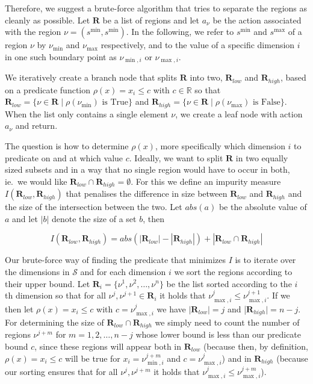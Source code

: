 Therefore, we suggest a brute-force algorithm that tries to separate the regions
as cleanly as possible. Let $\mathbf{R}$ be a list of regions and let $a_{\nu}$
be the action associated with the region $\nu = (s^{\min}, s^{\min})$. In the
following, we refer to $s^{\min}$ and $s^{\max}$ of a region $\nu$ by
$\nu_{\min}$ and $\nu_{\max}$ respectively, and to the value of a specific
dimension $i$ in one such boundary point as $\nu_{\min, i}$ or $\nu_{\max,i}$.

We iteratively create a branch node that splits $\mathbf{R}$ into two,
$\mathbf{R}_{low}$ and $\mathbf{R}_{high}$, based on a predicate function
$\rho(x) = x_i \le c$ with $c \in \mathbb{R}$ so that $\mathbf{R}_{low} = \{ \nu
\in \mathbf{R} \mid \rho(\nu_{\min}) \text{~is True} \}$ and $\mathbf{R}_{high}
= \{ \nu \in \mathbf{R} \mid \rho(\nu_{\max}) \text{~is False} \}$. When the
list only contains a single element $\nu$, we create a leaf node with action
$a_{\nu}$ and return.

The question is how to determine $\rho(x)$, more specifically which dimension
$i$ to predicate on and at which value $c$. Ideally, we want to split
$\mathbf{R}$ in two equally sized subsets and in a way that no single region
would have to occur in both, ie.\ we would like $\mathbf{R}_{low} \cap
\mathbf{R}_{high} = \emptyset$. For this we define an impurity measure
$I(\mathbf{R}_{low},\mathbf{R}_{high})$ that penalises the difference in size
between $\mathbf{R}_{low}$ and $\mathbf{R}_{high}$ and the size of the
intersection between the two. Let $abs(a)$ be the absolute value of $a$ and let
$|b|$ denote the size of a set $b$, then

\[
    I(\mathbf{R}_{low}, \mathbf{R}_{high})  = abs(|\mathbf{R}_{low}| -
    |\mathbf{R}_{high}|) + |\mathbf{R}_{low} \cap \mathbf{R}_{high}|
\]


Our brute-force way of finding the predicate that minimizes $I$ is to iterate
over the dimensions in $\mathcal{S}$ and for each dimension $i$ we sort the
regions according to their upper bound. Let $\mathbf{R}_i = \{ \nu^1, \nu^2,
\ldots, \nu^n \}$ be the list sorted according to the $i$ th dimension so that
for all $\nu^j, \nu^{j+1} \in \mathbf{R}_{i}$ it holds that $\nu^{j}_{\max,i} \le
\nu^{j+1}_{\max,i}$. If we then let $\rho(x) = x_i \le c$ with $c =
\nu^{j}_{\max,i}$ we have $|\mathbf{R}_{low}| = j$ and |$\mathbf{R}_{high}| = n
- j$. For determining the size of $\mathbf{R}_{low} \cap \mathbf{R}_{high}$ we
simply need to count the number of regions $\nu^{j+m}$ for $m = 1, 2, \ldots,
n-j$ whose lower bound is less than our predicate bound $c$, since these regions
will appear both in $\mathbf{R}_{low}$ (because then, by definition, $\rho(x) = x_i
\le c$ will be true for $x_i = \nu^{j+m}_{\min,i}$ and $c = \nu^{j}_{\max,i}$)
and in $\mathbf{R}_{high}$ (because our sorting ensures that for all
$\nu^{j},\nu^{j+m}$ it holds that $\nu^{j}_{\max,i} \le \nu^{j+m}_{\max,i}$).

